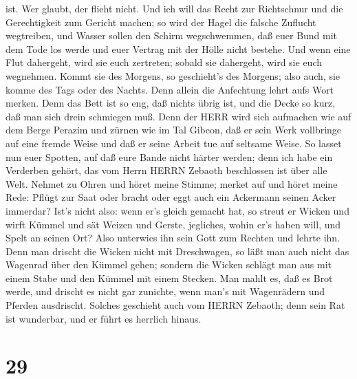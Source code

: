 ist. Wer glaubt, der flieht nicht.  Und ich will das Recht
zur Richtschnur und die Gerechtigkeit zum Gericht machen; so wird der
Hagel die falsche Zuflucht wegtreiben, und Wasser sollen den Schirm
wegschwemmen,  daß euer Bund mit dem Tode los werde und
euer Vertrag mit der Hölle nicht bestehe. Und wenn eine Flut dahergeht,
wird sie euch zertreten; sobald sie dahergeht, wird sie euch wegnehmen.
 Kommt sie des Morgens, so geschieht's des Morgens; also
auch, sie komme des Tags oder des Nachts. Denn allein die Anfechtung
lehrt aufs Wort merken.  Denn das Bett ist so eng, daß
nichts übrig ist, und die Decke so kurz, daß man sich drein schmiegen
muß.  Denn der HERR wird sich aufmachen wie auf dem Berge
Perazim und zürnen wie im Tal Gibeon, daß er sein Werk vollbringe auf
eine fremde Weise und daß er seine Arbeit tue auf seltsame Weise.
 So lasset nun euer Spotten, auf daß eure Bande nicht
härter werden; denn ich habe ein Verderben gehört, das vom Herrn HERRN
Zebaoth beschlossen ist über alle Welt.  Nehmet zu Ohren
und höret meine Stimme; merket auf und höret meine Rede: 
Pflügt zur Saat oder bracht oder eggt auch ein Ackermann seinen Acker
immerdar?  Ist's nicht also: wenn er's gleich gemacht hat,
so streut er Wicken und wirft Kümmel und sät Weizen und Gerste,
jegliches, wohin er's haben will, und Spelt an seinen Ort? 
Also unterwies ihn sein Gott zum Rechten und lehrte ihn. 
Denn man drischt die Wicken nicht mit Dreschwagen, so läßt man auch
nicht das Wagenrad über den Kümmel gehen; sondern die Wicken schlägt man
aus mit einem Stabe und den Kümmel mit einem Stecken.  Man
mahlt es, daß es Brot werde, und drischt es nicht gar zunichte, wenn
man's mit Wagenrädern und Pferden ausdrischt.  Solches
geschieht auch vom HERRN Zebaoth; denn sein Rat ist wunderbar, und er
führt es herrlich hinaus.

\hypertarget{section-28}{%
\section{29}\label{section-28}}

